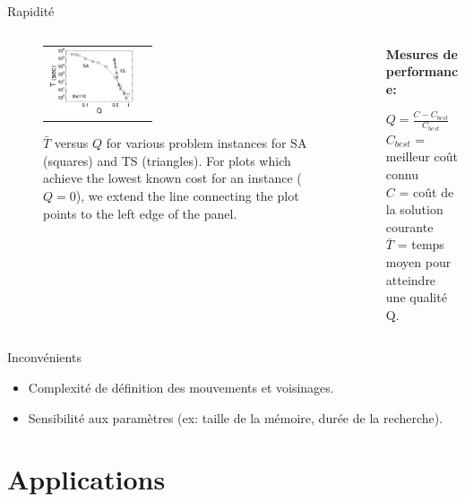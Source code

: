 \documentclass{beamer}
\begin{document}
\begin{frame}{Rapidité}
\begin{columns}
\begin{column}{0.6\textwidth}
\begin{figure}[ht]
\begin{center}
\begin{tabular}{cc}
                        \includegraphics[width=2.5cm]{figures/pdre110Ro.eps}
                    \end{tabular}
                \end{center}
                \caption{$\bar T$ versus $Q$ for various problem instances for SA (squares) and TS (triangles).  For plots which
                    achieve the lowest known cost for an instance ($Q=0$), we extend the
                    line connecting the plot points to the left edge of the panel.}
                \label{pCRo}
            \end{figure}
        \end{column}
        \begin{column}{0.4\textwidth}

            \textbf{Mesures de performance:}
            \medskip

            $Q = \frac{C - C_{best}}{C_{best}}$ \\
            $C_{best}$ = meilleur coût connu \\
            $C$ = coût de la solution courante \\
            $\bar T$ = temps moyen pour atteindre une qualité Q.
        \end{column}
    \end{columns}
\end{frame}

\begin{frame}{Inconvénients}
    \begin{itemize}
        \item Complexité de définition des mouvements et voisinages.
        \item Sensibilité aux paramètres (ex: taille de la mémoire, durée de la recherche).
    \end{itemize}

\end{frame}

\section{Applications}
\end{document}
